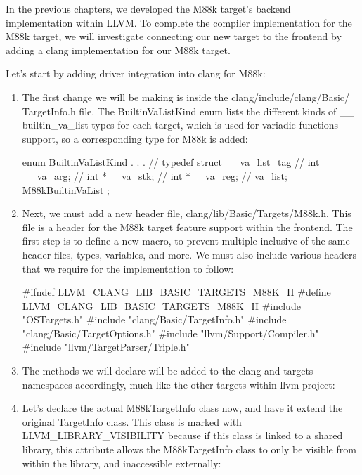 
In the previous chapters, we developed the M88k target’s backend implementation within LLVM. To complete the compiler implementation for the M88k target, we will investigate connecting our new target to the frontend by adding a clang implementation for our M88k target.


Let’s start by adding driver integration into clang for M88k:

\begin{enumerate}
\item
The first change we will be making is inside the clang/include/clang/Basic/ TargetInfo.h file. The BuiltinVaListKind enum lists the different kinds of \_\_ builtin\_va\_list types for each target, which is used for variadic functions support, so a corresponding type for M88k is added:

\begin{cpp}
enum BuiltinVaListKind {
    . . .
    // typedef struct __va_list_tag {
        // int __va_arg;
        // int *__va_stk;
        // int *__va_reg;
        //} va_list;
    M88kBuiltinVaList
};
\end{cpp}

\item
Next, we must add a new header file, clang/lib/Basic/Targets/M88k.h. This file is a header for the M88k target feature support within the frontend. The first step is to define a new macro, to prevent multiple inclusive of the same header files, types, variables, and more. We must also include various headers that we require for the implementation to follow:

\begin{cpp}
#ifndef LLVM_CLANG_LIB_BASIC_TARGETS_M88K_H
#define LLVM_CLANG_LIB_BASIC_TARGETS_M88K_H
#include "OSTargets.h"
#include "clang/Basic/TargetInfo.h"
#include "clang/Basic/TargetOptions.h"
#include "llvm/Support/Compiler.h"
#include "llvm/TargetParser/Triple.h"
\end{cpp}

\item
The methods we will declare will be added to the clang and targets namespaces accordingly, much like the other targets within llvm-project:

\begin{cpp}
namespace clang {
namespace targets {
\end{cpp}

\item
Let’s declare the actual M88kTargetInfo class now, and have it extend the original TargetInfo class. This class is marked with LLVM\_LIBRARY\_VISIBILITY because if this class is linked to a shared library, this attribute allows the M88kTargetInfo class to only be visible from within the library, and inaccessible externally:


\end{enumerate}

